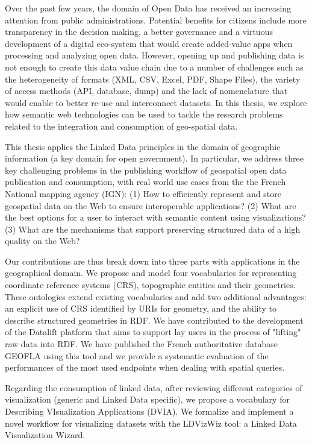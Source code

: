 Over the past few years, the domain of Open Data has received an increasing attention from public administrations. Potential benefits for citizens include more transparency in the decision making, a better governance and a virtuous development of a digital eco-system that would create added-value apps when processing and analyzing open data. However, opening up and publishing data is not enough to create this data value chain due to a number of challenges such as the heterogeneity of formats (XML, CSV, Excel, PDF, Shape Files), the variety of access methods (API, database, dump) and the lack of nomenclature that would enable to better re-use and interconnect datasets. In this thesis, we explore how semantic web technologies can be used to tackle the research problems related to the integration and consumption of geo-spatial data.

This thesis applies the Linked Data principles in the domain of geographic information (a key domain for open government). In particular, we address three key challenging problems in the publishing workflow of geospatial open data publication and consumption, with real world use cases from the the French National mapping agency (IGN): (1) How to efficiently represent and store geospatial data on the Web to ensure interoperable applications? (2) What are the best options for a user to interact with semantic content using visualizations? (3) What are the mechanisms that support preserving structured data of a high quality on the Web?

Our contributions are thus break down into three parts with applications in the geographical domain. We propose and model four vocabularies for representing coordinate reference systems (CRS), topographic entities and their geometries. These ontologies extend existing vocabularies and add two additional advantages: an explicit use of CRS identified by URIs for geometry, and the ability to describe structured geometries in RDF. We have contributed to the development of the Datalift platform that aims to support lay users in the process of "lifting" raw data into RDF. We have published the French authoritative database GEOFLA using this tool and we provide a systematic evaluation of the performances of the most used endpoints when dealing with spatial queries. 

Regarding the consumption of linked data, after reviewing different categories of visualization (generic and Linked Data specific), we propose a vocabulary for Describing VIsualization Applications (DVIA). We formalize and implement a novel workflow for visualizing datasets with the LDVizWiz tool: a Linked Data Visualization Wizard. 

